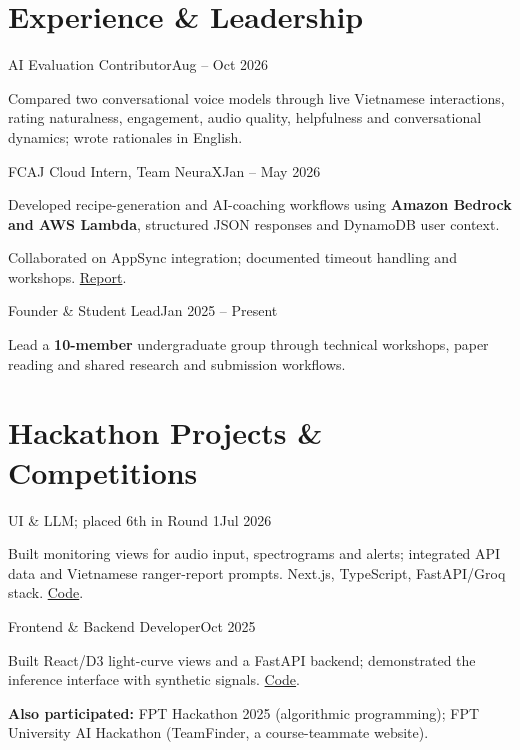 \documentclass[11pt,a4paper]{article}
\begin{document}
\section{Experience \& Leadership}
{AI Evaluation Contributor}{Aug -- Oct 2026}
\begin{highlights}
\item Compared two conversational voice models through live Vietnamese interactions, rating naturalness, engagement, audio quality, helpfulness and conversational dynamics; wrote rationales in English.
\end{highlights}
{FCAJ Cloud Intern, Team NeuraX}{Jan -- May 2026}
\begin{highlights}
\item Developed recipe-generation and AI-coaching workflows using \textbf{Amazon Bedrock and AWS Lambda}, structured JSON responses and DynamoDB user context.
\item Collaborated on AppSync integration; documented timeout handling and workshops. \href{https://hei1sme.github.io/hei-FCAJ-intership-report/}{Report}.
\end{highlights}
{Founder \& Student Lead}{Jan 2025 -- Present}
\begin{highlights}
\item Lead a \textbf{10-member} undergraduate group through technical workshops, paper reading and shared research and submission workflows.
\end{highlights}

\section{Hackathon Projects \& Competitions}
{UI \& LLM; placed 6th in Round 1}{Jul 2026}
\begin{highlights}
\item Built monitoring views for audio input, spectrograms and alerts; integrated API data and Vietnamese ranger-report prompts. Next.js, TypeScript, FastAPI/Groq stack. \href{https://github.com/hei1sme/BioListen-VN}{Code}.
\end{highlights}
{Frontend \& Backend Developer}{Oct 2025}
\begin{highlights}
\item Built React/D3 light-curve views and a FastAPI backend; demonstrated the inference interface with synthetic signals. \href{https://github.com/hei1sme/cosmicoptic-webapp}{Code}.
\end{highlights}
\textbf{Also participated:} FPT Hackathon 2025 (algorithmic programming); FPT University AI Hackathon (TeamFinder, a course-teammate website).
\end{document}
